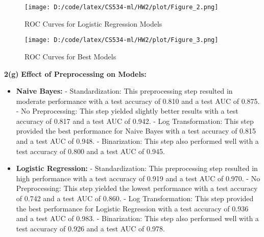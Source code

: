\documentclass[10pt,letterpaper]{article}
\begin{document}
                \begin{figure}[H]
                    \centering
                    \texttt{[image: D:/code/latex/CS534-ml/HW2/plot/Figure\_2.png]}
                    \caption{ROC Curves for Logistic Regression Models}
                    \label{fig:lr_roc}
                \end{figure}
                
                \begin{figure}[H]
                    \centering
                    \texttt{[image: D:/code/latex/CS534-ml/HW2/plot/Figure\_3.png]}
                    \caption{ROC Curves for Best Models}
                    \label{fig:best_roc}
                \end{figure} 
            \textbf{2(g)}
                \textbf{Effect of Preprocessing on Models:}
                \begin{itemize}
                    \item \textbf{Naive Bayes:} 
                        - Standardization: This preprocessing step resulted in moderate performance with a test accuracy of 0.810 and a test AUC of 0.875.
                        - No Preprocessing: This step yielded slightly better results with a test accuracy of 0.817 and a test AUC of 0.942.
                        - Log Transformation: This step provided the best performance for Naive Bayes with a test accuracy of 0.815 and a test AUC of 0.948.
                        - Binarization: This step also performed well with a test accuracy of 0.800 and a test AUC of 0.945.
                    \item \textbf{Logistic Regression:} 
                        - Standardization: This preprocessing step resulted in high performance with a test accuracy of 0.919 and a test AUC of 0.970.
                        - No Preprocessing: This step yielded the lowest performance with a test accuracy of 0.742 and a test AUC of 0.860.
                        - Log Transformation: This step provided the best performance for Logistic Regression with a test accuracy of 0.936 and a test AUC of 0.983.
                        - Binarization: This step also performed well with a test accuracy of 0.926 and a test AUC of 0.978.
                \end{itemize}
                
\end{document}
